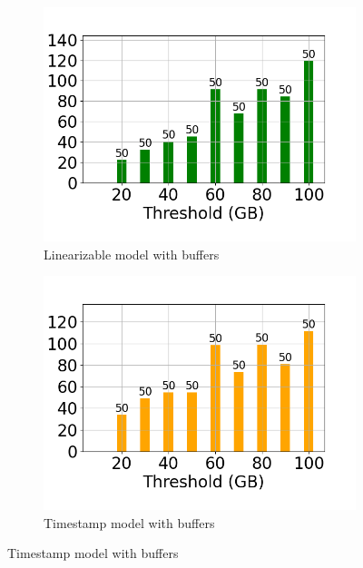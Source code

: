 \begin{figure}
	\centering
	\begin{subfigure}[c]{0.48\textwidth}
		\includegraphics[width=1\textwidth]   {figures/Experiments/Dynamic/Progress/7/average_query_time_per_batch_version_999777015_10485760_10_delay[7].png}
		\caption{Linearizable model with buffers}
		\label{fig:progress-queries-7-logical}
	\end{subfigure}
	\begin{subfigure}[c]{0.48\textwidth}
		\includegraphics[width=1\textwidth]   {figures/Experiments/Dynamic/Progress/7/average_query_time_per_batch_version_999777018_10485760_10_delay[7].png}
		\caption{Timestamp model with buffers}
		\label{fig:progress-queries-7-system}

\end{subfigure}
\end{figure}
